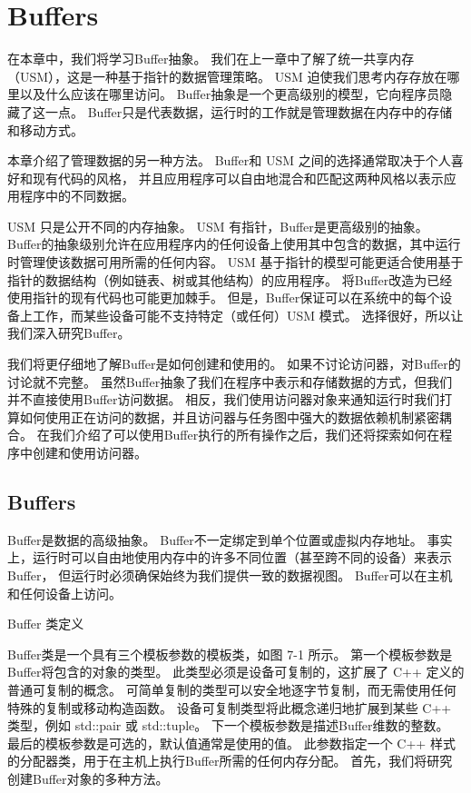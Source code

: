 \section{Buffers}
在本章中，我们将学习Buffer抽象。 我们在上一章中了解了统一共享内存（USM），这是一种基于指针的数据管理策略。 
USM 迫使我们思考内存存放在哪里以及什么应该在哪里访问。 Buffer抽象是一个更高级别的模型，它向程序员隐藏了这一点。 
Buffer只是代表数据，运行时的工作就是管理数据在内存中的存储和移动方式。

本章介绍了管理数据的另一种方法。 Buffer和 USM 之间的选择通常取决于个人喜好和现有代码的风格，
并且应用程序可以自由地混合和匹配这两种风格以表示应用程序中的不同数据。

USM 只是公开不同的内存抽象。 USM 有指针，Buffer是更高级别的抽象。 
Buffer的抽象级别允许在应用程序内的任何设备上使用其中包含的数据，其中运行时管理使该数据可用所需的任何内容。 
USM 基于指针的模型可能更适合使用基于指针的数据结构（例如链表、树或其他结构）的应用程序。 
将Buffer改造为已经使用指针的现有代码也可能更加棘手。 
但是，Buffer保证可以在系统中的每个设备上工作，而某些设备可能不支持特定（或任何）USM 模式。 
选择很好，所以让我们深入研究Buffer。

我们将更仔细地了解Buffer是如何创建和使用的。 如果不讨论访问器，对Buffer的讨论就不完整。 
虽然Buffer抽象了我们在程序中表示和存储数据的方式，但我们并不直接使用Buffer访问数据。 
相反，我们使用访问器对象来通知运行时我们打算如何使用正在访问的数据，并且访问器与任务图中强大的数据依赖机制紧密耦合。 
在我们介绍了可以使用Buffer执行的所有操作之后，我们还将探索如何在程序中创建和使用访问器。


\subsection{Buffers}
Buffer是数据的高级抽象。 Buffer不一定绑定到单个位置或虚拟内存地址。 
事实上，运行时可以自由地使用内存中的许多不同位置（甚至跨不同的设备）来表示Buffer，
但运行时必须确保始终为我们提供一致的数据视图。 Buffer可以在主机和任何设备上访问。

{\color{red} Buffer 类定义}

Buffer类是一个具有三个模板参数的模板类，如图 7-1 所示。 第一个模板参数是Buffer将包含的对象的类型。 
此类型必须是设备可复制的，这扩展了 C++ 定义的普通可复制的概念。 
可简单复制的类型可以安全地逐字节复制，而无需使用任何特殊的复制或移动构造函数。 
设备可复制类型将此概念递归地扩展到某些 C++ 类型，例如 std::pair 或 std::tuple。 
下一个模板参数是描述Buffer维数的整数。 最后的模板参数是可选的，默认值通常是使用的值。 
此参数指定一个 C++ 样式的分配器类，用于在主机上执行Buffer所需的任何内存分配。 
首先，我们将研究创建Buffer对象的多种方法。


